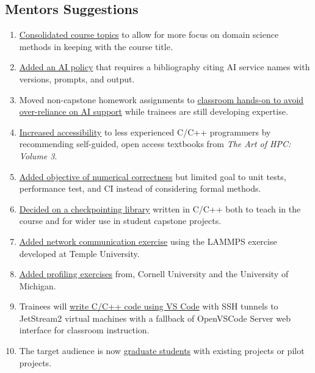 \documentclass[
portrait,
custom
]{sciposter}
\begin{document}
\begin{multicols}{2}
  \section*{Mentors Suggestions}
  \begin{multicols}{2}
    \begin{enumerate}
    \item \ul{Consolidated course topics} %
      to allow for more focus on domain science methods %
      in keeping with the course title.
    \item \ul{Added an AI policy} %
      that requires a bibliography %
      citing AI service names with versions, prompts, and output.
    \item Moved non-capstone homework assignments to %
      \ul{classroom hands-on to avoid over-reliance on AI support} %
      while trainees are still developing expertise.
    \item \ul{Increased accessibility} %
      to less experienced C/C++ programmers %
      by recommending self-guided, open access textbooks %
      from \emph{The Art of HPC: Volume 3}.
    \item \ul{Added objective of numerical correctness} %
      but limited goal to unit tests, performance test, and CI %
      instead of considering formal methods.
    \item \ul{Decided on a checkpointing library} %
      written in C/C++ %
      both to teach in the course %
      and for wider use in student capstone projects.
    \item \ul{Added network communication exercise} %
      using the LAMMPS exercise developed at Temple University.
    \item \ul{Added profiling exercises} %
      from, Cornell University %
      and the University of Michigan.
    \item Trainees will \ul{write C/C++ code using VS Code} %
      with SSH tunnels to JetStream2 virtual machines %
      with a fallback of OpenVSCode Server web interface %
      for classroom instruction.
    \item The target audience is now \ul{graduate students} %
      with existing projects or pilot projects.
    \end{enumerate}
  \end{multicols}


\end{multicols}
\end{document}
